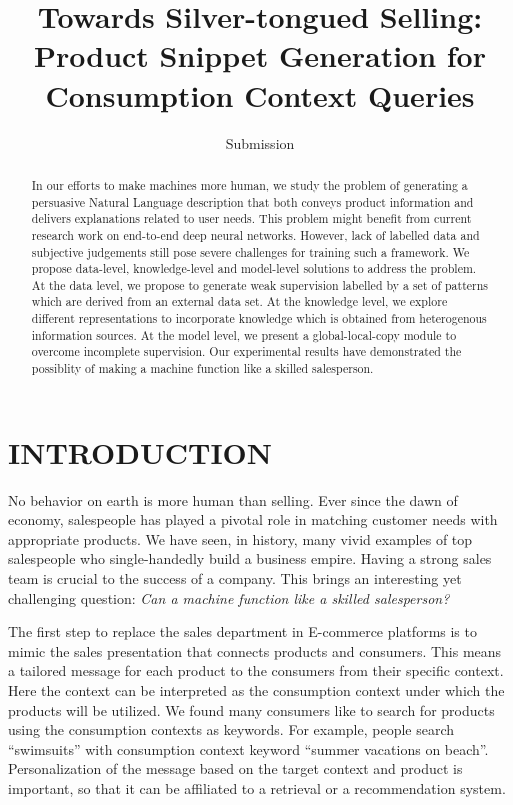 \documentclass[sigconf]{acmart}
\begin{document}
\title{Towards Silver-tongued Selling: Product Snippet Generation for Consumption Context Queries}

\author{Submission }


\begin{abstract}
In our efforts to make machines more human, we study the problem of generating a persuasive Natural Language description that both conveys product information and delivers explanations related to user needs. This problem might benefit from current research work on end-to-end deep neural networks. However, lack of labelled data and subjective judgements still pose severe challenges for training such a framework. We propose data-level, knowledge-level and model-level solutions to address the problem. At the data level, we propose to generate weak supervision labelled by a set of patterns which are derived from an external data set. At the knowledge level, we explore different representations to incorporate knowledge which is obtained from heterogenous information sources. At the model level, we present a global-local-copy module to overcome incomplete supervision. Our experimental results have demonstrated the possiblity of making a machine function like a skilled salesperson. 
\end{abstract}



\maketitle

\section{INTRODUCTION}
No behavior on earth is more human than selling.
Ever since the dawn of economy, salespeople has played a pivotal role in matching customer needs with appropriate products. 
We have seen, in history, many vivid examples of top salespeople who single-handedly build a business empire.
Having a strong sales team is crucial to the success of a company. 
This brings an interesting yet challenging question: \textit{ Can a machine function like a skilled salesperson?} 

The first step to replace the sales department in E-commerce platforms is to mimic the sales presentation that connects products and consumers.
This means a tailored message for each product to the consumers from their specific context. 
Here the context can be interpreted as the consumption context under which the products will be utilized. 
We found many consumers like to search for products using the consumption contexts as keywords. For example, people search ``swimsuits'' with consumption context keyword ``summer vacations on beach''. 
Personalization of the message based on the target context and product is important, so that it can be affiliated to a retrieval or a recommendation system.
\end{document}
